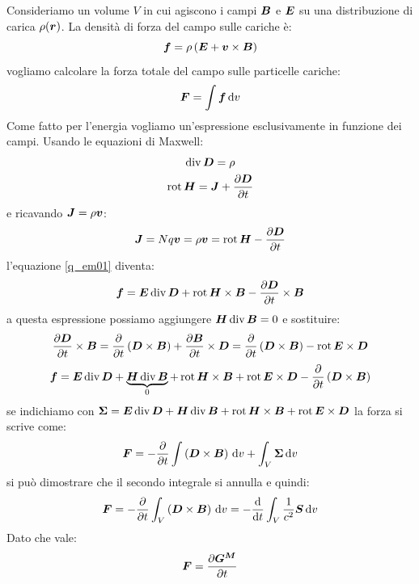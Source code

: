 Consideriamo un volume $V$ in cui agiscono i campi $\boldsymbol{B}$ e $\boldsymbol{E}$ su una distribuzione di carica $\rho(\boldsymbol{r})$. La densità di forza del campo sulle cariche è:
\begin{equation}
  \boldsymbol{f}=\rho\left(\boldsymbol{E}+\boldsymbol{v}\times\boldsymbol{B}\right)
  \label{q_em01}
\end{equation}
vogliamo calcolare la forza totale del campo sulle particelle cariche:
\begin{equation}
  \boldsymbol{F}=\int \boldsymbol{f}\,\mathrm{d} v
\end{equation}
Come fatto per l'energia vogliamo un'espressione esclusivamente in funzione dei campi. Usando le equazioni di Maxwell:
\begin{gather}
  \operatorname{div}\boldsymbol{D}=\rho \\
  \operatorname{rot}\boldsymbol{H}=\boldsymbol{J}+\frac{\partial \boldsymbol{D}}{\partial t}
\end{gather}
e ricavando $\boldsymbol{J}=\rho\boldsymbol{v}$:
\[
  \boldsymbol{J}=Nq\boldsymbol{v}=\rho\boldsymbol{v}=\operatorname{rot}\boldsymbol{H}-\frac{\partial\boldsymbol{D}}{\partial t}
\]
l'equazione \eqref{q_em01} diventa:
\begin{equation}
  \boldsymbol{f}=\boldsymbol{E}\operatorname{div}\boldsymbol{D}+\operatorname{rot}\boldsymbol{H}\times\boldsymbol{B}-\frac{\partial\boldsymbol{D}}{\partial t}\times\boldsymbol{B}
\end{equation}
a questa espressione possiamo aggiungere $\boldsymbol{H}\operatorname{div}\boldsymbol{B}=0$ e sostituire:
\begin{equation}
  \frac{\partial\boldsymbol{D}}{\partial t}\times\boldsymbol{B}=\frac{\partial}{\partial t}\left(\boldsymbol{D}\times\boldsymbol{B}\right)+\frac{\partial\boldsymbol{B}}{\partial t}\times\boldsymbol{D}=\frac{\partial}{\partial t}\left(\boldsymbol{D}\times\boldsymbol{B}\right)-\operatorname{rot}\boldsymbol{E}\times\boldsymbol{D}
\end{equation}
\begin{equation}
  \boldsymbol{f}=\boldsymbol{E}\operatorname{div}\boldsymbol{D}+\underbrace{\boldsymbol{H}\operatorname{div}\boldsymbol{B}}_{0}+\operatorname{rot}\boldsymbol{H}\times\boldsymbol{B}+\operatorname{rot}\boldsymbol{E}\times\boldsymbol{D}-\frac{\partial}{\partial t}\left(\boldsymbol{D}\times\boldsymbol{B}\right)
\end{equation}
se indichiamo con $\boldsymbol{\Sigma}=\boldsymbol{E}\operatorname{div}\boldsymbol{D}+\boldsymbol{H}\operatorname{div}\boldsymbol{B}+\operatorname{rot}\boldsymbol{H}\times\boldsymbol{B}+\operatorname{rot}\boldsymbol{E}\times\boldsymbol{D}$ la forza si scrive come:
\begin{equation}
  \boldsymbol{F}=-\frac{\partial}{\partial t}\int\left(\boldsymbol{D}\times\boldsymbol{B}\right)\,\mathrm{d} v+\int_V\boldsymbol{\Sigma}\,\mathrm{d} v
\end{equation}
si può dimostrare che il secondo integrale si annulla e quindi:
\begin{equation}
  \boldsymbol{F}=-\frac{\partial}{\partial t}\int_V\left(\boldsymbol{D}\times\boldsymbol{B}\right)\,\mathrm{d} v = -\frac{\mathrm{d}}{\mathrm{d} t}\int_V\frac{1}{c^2} \boldsymbol{S}\,\mathrm{d} v
\end{equation}
Dato che vale:
\begin{equation}
  \boldsymbol{F}=\frac{\partial\boldsymbol{G^M}}{\partial t}
\end{equation}
